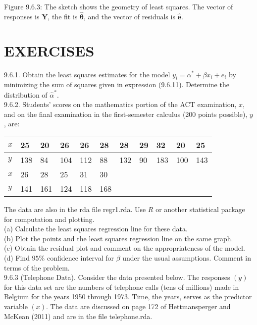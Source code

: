 Figure 9.6.3: The sketch shows the geometry of least squares. The vector of responses is $\mathbf{Y}$, the fit is $\widehat{\boldsymbol{\theta}}$, and the vector of residuals is $\hat{\mathbf{e}}$.

\section*{EXERCISES}
9.6.1. Obtain the least squares estimates for the model $y_{i}=\alpha^{*}+\beta x_{i}+e_{i}$ by minimizing the sum of squares given in expression (9.6.11). Determine the distribution of $\hat{\alpha}^{*}$.\\
9.6.2. Students' scores on the mathematics portion of the ACT examination, $x$, and on the final examination in the first-semester calculus (200 points possible), $y$, are:

\begin{center}
\begin{tabular}{|l|l|l|l|l|l|l|l|l|l|l|}
\hline
$x$ & 25 & 20 & 26 & 26 & 28 & 28 & 29 & 32 & 20 & 25 \\
\hline
$y$ & 138 & 84 & 104 & 112 & 88 & 132 & 90 & 183 & 100 & 143 \\
\hline
$x$ & 26 & 28 & 25 & 31 & 30 & \multicolumn{5}{|c|}{\multirow{2}{*}{}} \\
\hline
$y$ & 141 & 161 & 124 & 118 & 168 &  &  &  &  &  \\
\hline
\end{tabular}
\end{center}

The data are also in the rda file regr1.rda. Use $R$ or another statistical package for computation and plotting.\\
(a) Calculate the least squares regression line for these data.\\
(b) Plot the points and the least squares regression line on the same graph.\\
(c) Obtain the residual plot and comment on the appropriateness of the model.\\
(d) Find $95 \%$ confidence interval for $\beta$ under the usual assumptions. Comment in terms of the problem.\\
9.6.3 (Telephone Data). Consider the data presented below. The responses $(y)$ for this data set are the numbers of telephone calls (tens of millions) made in Belgium for the years 1950 through 1973. Time, the years, serves as the predictor variable $(x)$. The data are discussed on page 172 of Hettmansperger and McKean (2011) and are in the file telephone.rda.

